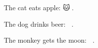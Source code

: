 \documentclass{article}
\begin{document}
The cat eats apple:  {\EmojiFont 🐱🍎}. \par
The dog drinks beer: {\EmojiFont 🐶🍺}. \par
The monkey gets the moon: {\EmojiFont 🙈🌛}.
\end{document}
